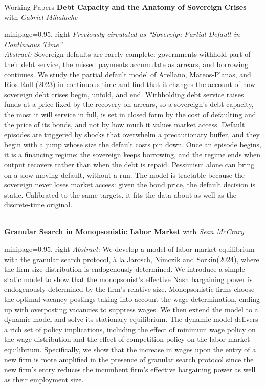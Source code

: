 \documentclass{cv} %
\begin{document}
\begin{rSection}{Working Papers}
\newpage
\medskip
{\bf Debt Capacity and the Anatomy of Sovereign Crises} with \emph{Gabriel Mihalache} \\
	 \begin{adjustbox}{minipage=0.95\textwidth, right}
		\vspace{0.3em} \emph{Previously circulated as ``Sovereign Partial Default in Continuous Time''} \\
		{\emph{Abstract:} Sovereign defaults are rarely complete: governments withhold part of their debt service, the missed payments accumulate as arrears, and borrowing continues. We study the partial default model of Arellano, Mateos-Planas, and Ríos-Rull (2023) in continuous time and find that it changes the account of how sovereign debt crises begin, unfold, and end. Withholding debt service raises funds at a price fixed by the recovery on arrears, so a sovereign's debt capacity, the most it will service in full, is set in closed form by the cost of defaulting and the price of its bonds, and not by how much it values market access. Default episodes are triggered by shocks that overwhelm a precautionary buffer, and they begin with a jump whose size the default costs pin down. Once an episode begins, it is a financing regime: the sovereign keeps borrowing, and the regime ends when output recovers rather than when the debt is repaid. Pessimism alone can bring on a slow-moving default, without a run. The model is tractable because the sovereign never loses market access: given the bond price, the default decision is static. Calibrated to the same targets, it fits the data about as well as the discrete-time original.}
	\end{adjustbox}\\

\medskip
{\bf Granular Search in Monopsonistic Labor Market} with \emph{Sean McCrary} \\
\begin{adjustbox}{minipage=0.95\textwidth, right}
	\vspace{0.3em} {\emph{Abstract:} We develop a model of labor market equilibrium with the granular search protocol, à la Jarosch, Nimczik and Sorkin(2024), where the firm size distribution is endogenously determined. We introduce a simple static model to show that the monopsonist's effective Nash bargaining power is endogenously determined by the firm's relative size. Monopsonistic firms choose the optimal vacancy postings taking into account the wage determination, ending up with overposting vacancies to suppress wages. We then extend the model to a  dynamic model and solve its stationary equilibrium. The dynamic model delivers a rich set of policy implications, including the effect of minimum wage policy on the wage distribution and the effect of competition policy on the labor market equilibrium. Specifically, we show that the increase in wages upon the entry of a new firm is more amplified in the presence of granular search protocol since the new firm's entry reduces the incumbent firm's effective bargaining power as well as their employment size.}
\end{adjustbox}\\


\end{rSection}
\end{document}
